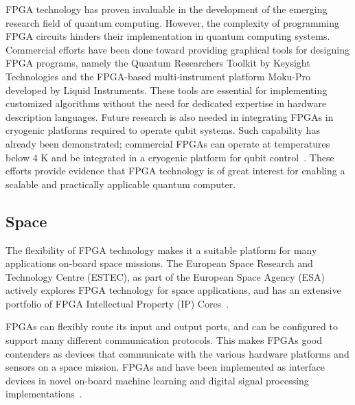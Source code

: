 
FPGA technology has proven invaluable in the development of the emerging research field of quantum computing.
However, the complexity of programming FPGA circuits hinders their implementation in quantum computing systems. Commercial efforts have been done toward providing graphical tools for designing FPGA programs, namely the Quantum Researchers Toolkit by Keysight Technologies and the FPGA-based multi-instrument platform Moku-Pro developed by Liquid Instruments. These tools are essential for implementing customized algorithms without the need for dedicated expertise in hardware description languages. Future research is also needed in integrating FPGAs in cryogenic platforms required to operate qubit systems. Such capability has already been demonstrated; commercial FPGAs can operate at temperatures below 4 K and be integrated in a cryogenic platform for qubit control~\cite{Homulle-2017}. These efforts provide evidence that FPGA technology is of great interest for enabling a scalable and practically applicable quantum computer. 


\subsection{Space}
\label{sec:space}
The flexibility of FPGA technology makes it a suitable platform for many applications on-board space missions. The European Space Research and Technology Centre (ESTEC), as part of the European Space Agency (ESA) actively explores FPGA technology for space applications, and has an extensive portfolio of FPGA Intellectual Property (IP) Cores~\cite{esa_ip}.


FPGAs can flexibly route its input and output ports, and can be configured to support many different communication protocols. This makes FPGAs good contenders as devices that communicate with the various hardware platforms and sensors on a space mission. FPGAs and have been implemented as interface devices in novel on-board machine learning and digital signal processing  implementations~\cite{Leon2021ImprovingSoC, Leon2021FPGABenchmarks, karapakula2024ncle}. 

